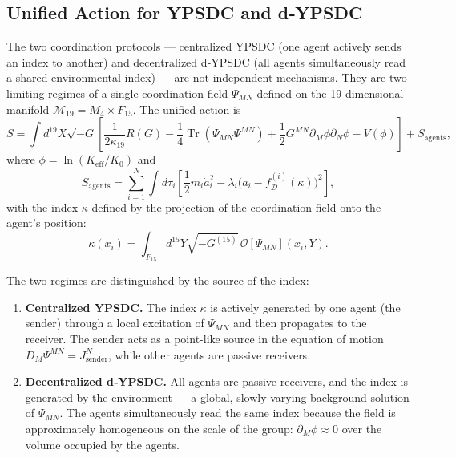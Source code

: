 \documentclass[12pt,a4paper]{article}
\DeclareMathOperator*{\Tr}{Tr}
\begin{document}
	\subsection{Unified Action for YPSDC and d‑YPSDC}
	\label{subsec:unified-action}
	
	The two coordination protocols — centralized YPSDC (one agent actively sends
	an index to another) and decentralized d‑YPSDC (all agents simultaneously
	read a shared environmental index) — are not independent mechanisms. They
	are two limiting regimes of a single coordination field $\Psi_{MN}$ defined on
	the 19‑dimensional manifold $\mathcal{M}_{19}=M_4\times F_{15}$. The unified
	action is
	\begin{equation}
		S = \int d^{19}X \sqrt{-G} \left[ \frac{1}{2\kappa_{19}} R(G)
		- \frac{1}{4} \Tr(\Psi_{MN}\Psi^{MN}) + \frac{1}{2} G^{MN}\partial_M\phi \partial_N\phi
		- V(\phi) \right] + S_{\mathrm{agents}},
		\label{eq:unified-S}
	\end{equation}
	where $\phi = \ln(K_{\mathrm{eff}}/K_0)$ and
	\begin{equation}
		S_{\mathrm{agents}} = \sum_{i=1}^{N} \int d\tau_i \left[ \frac{1}{2} m_i \dot a_i^2
		- \lambda_i \bigl( a_i - f_{\mathcal{D}}^{(i)}(\kappa) \bigr)^2 \right],
		\label{eq:unified-agents}
	\end{equation}
	with the index $\kappa$ defined by the projection of the coordination field
	onto the agent's position:
	\begin{equation}
		\kappa(x_i) = \int_{F_{15}} d^{15}Y \sqrt{-G^{(15)}}\,
		\mathcal{O}[\Psi_{MN}](x_i, Y).
		\label{eq:unified-kappa}
	\end{equation}
	
	The two regimes are distinguished by the source of the index:
	
	\begin{enumerate}[leftmargin=*, label=\textbf{(\arabic*)}]
		\item \textbf{Centralized YPSDC.} The index $\kappa$ is actively generated by
		one agent (the sender) through a local excitation of $\Psi_{MN}$ and then
		propagates to the receiver. The sender acts as a point-like source in the
		equation of motion $D_M\Psi^{MN} = J^{N}_{\mathrm{sender}}$, while other
		agents are passive receivers.
		\item \textbf{Decentralized d‑YPSDC.} All agents are passive receivers, and
		the index is generated by the environment — a global, slowly varying
		background solution of $\Psi_{MN}$. The agents simultaneously read the same
		index because the field is approximately homogeneous on the scale of the
		group: $\partial_M\phi \approx 0$ over the volume occupied by the agents.
	\end{enumerate}
	
\end{document}
